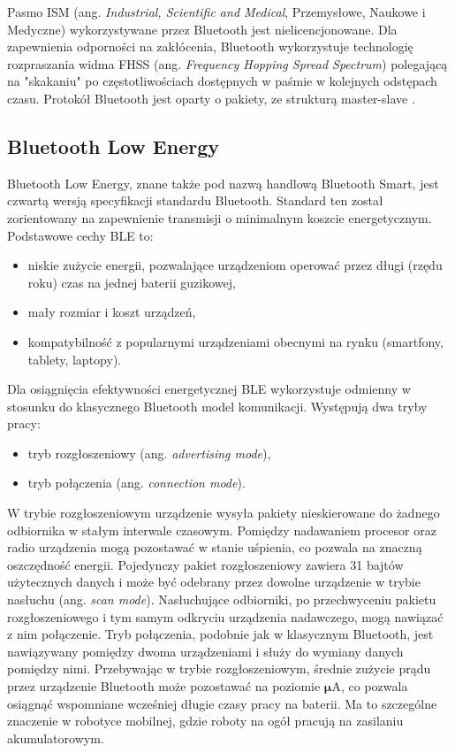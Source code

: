 Pasmo ISM (ang. \emph{Industrial, Scientific and Medical}, Przemysłowe, Naukowe i Medyczne) wykorzystywane przez Bluetooth jest nielicencjonowane. Dla zapewnienia odporności na zakłócenia, Bluetooth wykorzystuje technologię rozpraszania widma FHSS (ang. \emph{Frequency Hopping Spread Spectrum}) polegającą na "skakaniu" po częstotliwościach dostępnych w paśmie w kolejnych odstępach czasu. Protokół Bluetooth jest oparty o pakiety, ze strukturą master-slave \cite{ble}. 

\subsection{Bluetooth Low Energy}
\label{sec:ble}
Bluetooth Low Energy, znane także pod nazwą handlową Bluetooth Smart, jest czwartą wersją specyfikacji standardu Bluetooth. Standard ten został zorientowany na zapewnienie transmisji o minimalnym koszcie energetycznym. Podstawowe cechy BLE to: 
\begin{itemize}
 \item niskie zużycie energii, pozwalające urządzeniom operować przez długi (rzędu roku) czas na jednej baterii guzikowej,
 \item mały rozmiar i koszt urządzeń,
 \item kompatybilność z popularnymi urządzeniami obecnymi na rynku (smartfony, tablety, laptopy).
\end{itemize}

Dla osiągnięcia efektywności energetycznej BLE wykorzystuje odmienny w stosunku do klasycznego Bluetooth model komunikacji. Występują dwa tryby pracy:
\begin{itemize}
 \item tryb rozgłoszeniowy (ang. \emph{advertising mode}),
 \item tryb połączenia (ang. \emph{connection mode}).
\end{itemize}

W trybie rozgłoszeniowym urządzenie wysyła pakiety nieskierowane do żadnego odbiornika w stałym interwale czasowym. Pomiędzy nadawaniem procesor oraz radio urządzenia mogą pozostawać w stanie uśpienia, co pozwala na znaczną oszczędność energii. Pojedynczy pakiet rozgłoszeniowy zawiera 31 bajtów użytecznych danych i może być odebrany przez dowolne urządzenie w trybie nasłuchu (ang. \emph{scan mode}). 
Nasłuchujące odbiorniki, po przechwyceniu pakietu rozgłoszeniowego i tym samym odkryciu urządzenia nadawczego, mogą nawiązać z nim połączenie. Tryb połączenia, podobnie jak w klasycznym Bluetooth, jest nawiązywany pomiędzy dwoma urządzeniami i służy do wymiany danych pomiędzy nimi. Przebywając w trybie rozgłoszeniowym, średnie zużycie prądu przez urządzenie Bluetooth może pozostawać na poziomie $\mathbf{\mu}$A, co pozwala osiągnąć wspomniane wcześniej długie czasy pracy na baterii. Ma to szczególne znaczenie w robotyce mobilnej, gdzie roboty na ogół pracują na zasilaniu akumulatorowym. 




